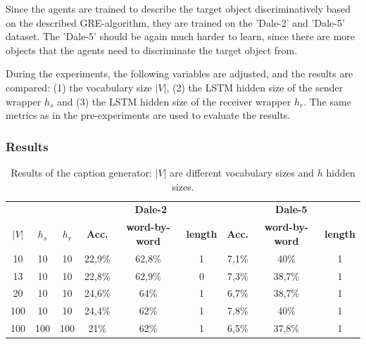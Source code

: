Since the agents are trained to describe the target object discriminatively based on the described GRE-algorithm, they are trained on the 'Dale-2' and 'Dale-5' dataset.
The 'Dale-5' should be again much harder to learn, since there are more objects that the agents need to discriminate the target object from.

During the experiments, the following variables are adjusted, and the results are compared:
(1) the vocabulary size $|V|$,
(2) the LSTM hidden size of the sender wrapper $h_s$ and
(3) the LSTM hidden size of the receiver wrapper $h_r$.
The same metrics as in the pre-experiments are used to evaluate the results.

\subsubsection*{Results}
\begin{table}[h]
    \centering
    \begin{tabular}{ccc|ccc|ccc}
        \toprule
              &         &         & \multicolumn{3}{c}{\textbf{Dale-2}} & \multicolumn{3}{c}{\textbf{Dale-5}}                                                                             \\\cmidrule(lr){4-6}\cmidrule(lr){7-9}
        $|V|$ & $h_{s}$ & $h_{r}$ & \textbf{Acc.}                       & \textbf{word-by-word}               & \textbf{length} & \textbf{Acc.} & \textbf{word-by-word} & \textbf{length} \\\midrule
        {10}  & {10}    & {10}    & {22,9\%}                            & {62,8\%}                            & {1}             & {7,1\%}       & {40\%}                & {1}             \\
        {13}  & {10}    & {10}    & {22,8\%}                            & {62,9\%}                            & {0}             & {7,3\%}       & {38,7\%}              & {1}             \\
        {20}  & {10}    & {10}    & {24,6\%}                            & {64\%}                              & {1}             & {6,7\%}       & {38,7\%}              & {1}             \\
        {100} & {10}    & {10}    & {24,4\%}                            & {62\%}                              & {1}             & {7,8\%}       & {40\%}                & {1}             \\
        {100} & {100}   & {100}   & {21\%}                              & {62\%}                              & {1}             & {6,5\%}       & {37,8\%}              & {1}             \\
        \bottomrule
    \end{tabular}
    \caption{Results of the caption generator: $|V|$ are different vocabulary sizes and $h$ hidden sizes.}
    \label{tab:results_caption_generator_game}
\end{table}

